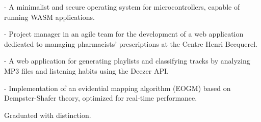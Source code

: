 \documentclass[10pt,a4paper,ragged2e,withhyper]{../AltaCV/altacv}
\begin{document}
\begin{paracol}{2}
  \divider


  \divider


  \smallskip


  \begin{minipage}[t]{0.49\linewidth}
    {\small {} - A minimalist and secure operating system for microcontrollers, capable of running WASM applications.}

    \divider

    {\small {} - Project manager in an agile team for the development of a web application dedicated to managing pharmacists' prescriptions at the Centre Henri Becquerel.}
  \end{minipage}
  \hfill
  \begin{minipage}[t]{0.49\linewidth}
    {\small {} - A web application for generating playlists and classifying tracks by analyzing MP3 files and listening habits using the Deezer API.}

    \divider

    {\small {} -  Implementation of an evidential mapping algorithm (EOGM) based on Dempster-Shafer theory, optimized for real-time performance.}
  \end{minipage}

  \medskip

  \switchcolumn



  \divider

  Graduated with distinction.


\end{paracol}
\end{document}
